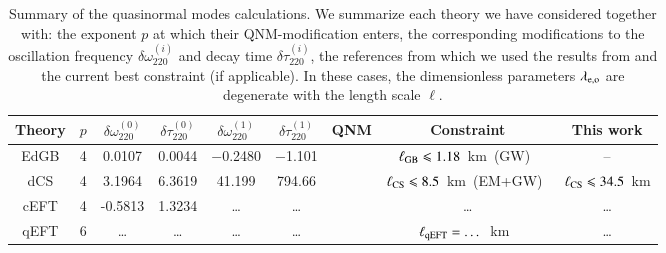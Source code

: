 \documentclass[twocolumn,
               prd,
               aps,
               superscriptaddress,
               tightenlines,
               nofootinbib,
               eqsecnum,
               amsfonts,
               amsmath,
               longbibliography]{revtex4-1}
\newcommand{\hs}[1]{{\textcolor{blue}{{[HS: #1]}} }}
\begin{document}
\begin{table}[th]
\begin{tabular}{c | c c c c c c c c}
\hline
\hline
Theory & $p$ & $\delta \omega^{(0)}_{220}$ & $\delta \tau^{(0)}_{220}$ & $\delta \omega^{(1)}_{220}$ & $\delta \tau^{(1)}_{220}$ & QNM & Constraint & This work \\
\hline
EdGB      & 4 & 0.0107 & 0.0044 & $-$0.2480 & $-$1.101 &  \cite{Blazquez-Salcedo:2016enn,Pierini:2021jxd} & $\ell_{\rm GB} \leqslant 1.18$~km~(GW)~\cite{Lyu:2022gdr} & -- \\
dCS       & 4 & 3.1964 & 6.3619 & 41.199 & 794.66 &  \cite{Wagle:2021tam}   & $\ell_{\rm CS} \leqslant 8.5$~km~(EM+GW)~\cite{Silva:2020acr}  & $\ell_{\rm CS} \leqslant 34.5$~km \\
cEFT  & 4 & -0.5813  & 1.3234 & \dots & \dots & \cite{Cano:2021myl} & \dots  & \dots \\
qEFT  & 6 & \dots  & \dots & \dots & \dots & \cite{Cano:2021myl} & $\ell_{\rm qEFT} = \dots$~km~\cite{Sennett:2019bpc}  & \dots \\
\hline
\hline
\end{tabular}
\caption{Summary of the quasinormal modes calculations.
%
We summarize each theory we have considered together with: the exponent $p$ at
which their QNM-modification enters, the corresponding modifications to the
oscillation frequency $\delta \omega^{(i)}_{220}$ and decay time $\delta \tau^{(i)}_{220}$, the
references from which we used the results from and the current best constraint
(if applicable).
%
%
In these cases, the dimensionless parameters $\lambda_{\rm e,o}$ are degenerate
with the length scale $\ell$.
%
}
\label{tab:ref_theories_qnms}
\end{table}

\end{document}
